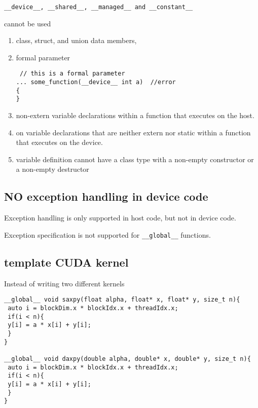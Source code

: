 \begin{verbatim}
__device__, __shared__, __managed__ and __constant__ 
\end{verbatim}
cannot be used
\begin{enumerate}
  \item  class, struct, and union data members,
  
  \item formal parameter
  
\begin{verbatim}
 // this is a formal parameter
... some_function(__device__ int a)  //error
{
}
\end{verbatim}  

  \item non-extern variable declarations within a function that executes on the host.
  
  \item on variable declarations that are neither extern nor static within a function that executes on the device. 
  
  \item variable definition cannot have a class type with a non-empty constructor or a non-empty destructor
\end{enumerate}


\subsection{NO exception handling in device code}

Exception handling is only supported in host code, but not in device code.

Exception specification is not supported for \verb!__global__! functions.

\subsection{template CUDA kernel}
\label{sec:template-CUDA-kernel}

Instead of writing two different kernels
\begin{verbatim}
__global__ void saxpy(float alpha, float* x, float* y, size_t n){
 auto i = blockDim.x * blockIdx.x + threadIdx.x;
 if(i < n){
 y[i] = a * x[i] + y[i];
 }
}

__global__ void daxpy(double alpha, double* x, double* y, size_t n){
 auto i = blockDim.x * blockIdx.x + threadIdx.x;
 if(i < n){
 y[i] = a * x[i] + y[i];
 }
}
\end{verbatim}

